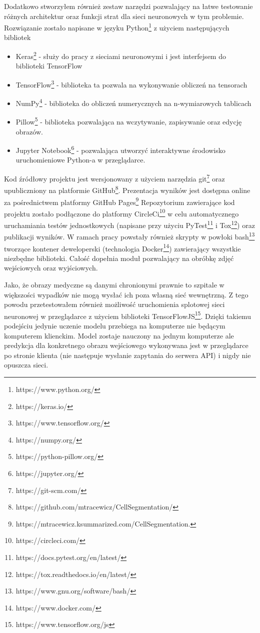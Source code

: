 \documentclass{article}
\begin{document}
Dodatkowo stworzyłem również zestaw narzędzi pozwalający na łatwe testowanie różnych architektur oraz funkcji strat dla sieci neuronowych w tym problemie.
Rozwiązanie zostało napisane w języku Python\footnote{https://www.python.org/} z użyciem następujących bibliotek
\begin{itemize}
    \item Keras\footnote{https://keras.io/} - służy do pracy z sieciami neuronowymi i jest interfejsem do biblioteki TensorFlow
    \item TensorFlow\footnote{https://www.tensorflow.org/} - biblioteka ta pozwala na wykonywanie obliczeń na tensorach
    \item NumPy\footnote{https://numpy.org/} - biblioteka do obliczeń numerycznych na n-wymiarowych tablicach
    \item Pillow\footnote{https://python-pillow.org/} - biblioteka pozwalająca na wczytywanie, zapisywanie oraz edycję obrazów.
    \item Jupyter Notebook\footnote{https://jupyter.org/} - pozwalająca utworzyć interaktywne środowisko uruchomieniowe Python-a w przeglądarce.
\end{itemize}
Kod źródłowy projektu jest wersjonowany z użyciem narzędzia git\footnote{https://git-scm.com/} \newline oraz upubliczniony na platformie GitHub\footnote{https://github.com/mtracewicz/CellSegmentation/}.
Prezentacja wyników jest dostępna online za pośrednictwem platformy GitHub Pages\footnote{ https://mtracewicz.ksummarized.com/CellSegmentation.}
Repozytorium zawierające kod projektu zostało podłączone do platformy CircleCi\footnote{https://circleci.com/} w celu automatycznego uruchamiania testów jednostkowych (napisane przy użyciu PyTest\footnote{https://docs.pytest.org/en/latest/} i Tox\footnote{https://tox.readthedocs.io/en/latest/}) oraz publikacji wyników.
W ramach pracy powstały również skrypty w powłoki bash\footnote{https://www.gnu.org/software/bash/} tworzące kontener deweloperski (technologia Docker\footnote{https://www.docker.com/}) zawierający wszystkie niezbędne biblioteki.
Całość dopełnia moduł pozwalający na obróbkę zdjęć wejściowych oraz wyjściowych.

Jako, że obrazy medyczne są danymi chronionymi prawnie to szpitale w większości wypadków nie mogą wysłać ich poza własną sieć wewnętrzną.
Z tego powodu przetestowałem również możliwość uruchomienia splotowej sieci neuronowej w przeglądarce z użyciem biblioteki TensorFlowJS\footnote{https://www.tensorflow.org/js}.
Dzięki takiemu podejściu jedynie uczenie modelu przebiega na komputerze nie będącym komputerem klienckim.
Model zostaje nauczony na jednym komputerze ale predykcja dla konkretnego obrazu wejściowego wykonywana jest w przeglądarce po stronie klienta (nie następuje wysłanie zapytania do serwera API) i nigdy nie opuszcza sieci.
\end{document}

